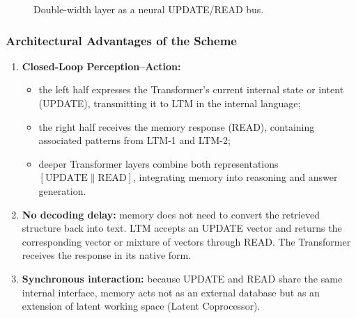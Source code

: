 \documentclass[11pt,a4paper]{article}
\begin{document}
\begin{figure}[h!]
\centering
{}
\caption{Double-width layer as a neural UPDATE/READ bus.}
\end{figure}

\subsubsection*{Architectural Advantages of the Scheme}
\begin{enumerate}
\item \textbf{Closed-Loop Perception--Action:}
\begin{itemize}
\item the left half expresses the Transformer's current internal state or intent (UPDATE), transmitting it to LTM in the internal language;
\item the right half receives the memory response (READ), containing associated patterns from LTM-1 and LTM-2;
\item deeper Transformer layers combine both representations $[\mathrm{UPDATE}\parallel\mathrm{READ}]$, integrating memory into reasoning and answer generation.
\end{itemize}
\item \textbf{No decoding delay:} memory does not need to convert the retrieved structure back into text. LTM accepts an UPDATE vector and returns the corresponding vector or mixture of vectors through READ. The Transformer receives the response in its native form.
\item \textbf{Synchronous interaction:} because UPDATE and READ share the same internal interface, memory acts not as an external database but as an extension of latent working space (Latent Coprocessor).
\end{enumerate}
\end{document}
